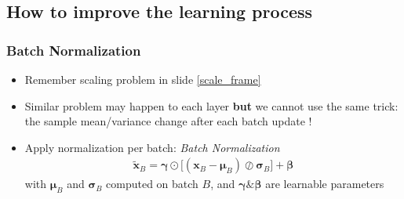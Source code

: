 \documentclass[pressentation,10pt,aspectratio=169,xcolor=table, colorlinks=true]{beamer}
\begin{document}
  \subsection{How to improve the learning process}

  \begin{frame}
    \frametitle{Batch Normalization}
    \begin{itemize}
    \item Remember scaling problem in slide \ref{scale_frame}
    \item Similar problem may happen to each layer \textbf{but} we cannot use the same trick: the sample mean/variance change after each batch update !
    \item<2-> Apply normalization per batch: \emph{Batch Normalization}
      \begin{align*}
        \tilde{\mathbf{x}}_B = \boldsymbol{\gamma}\odot\Big[(\mathbf{x}_B-\boldsymbol{\mu}_B)\oslash\boldsymbol{\sigma}_B\Big] + \boldsymbol{\beta}
      \end{align*}
      with \(\boldsymbol{\mu}_B\) and \(\boldsymbol{\sigma}_B\) computed on batch \(B\), and \(\boldsymbol{\gamma} \& \boldsymbol{\beta}\) are learnable parameters
    \end{itemize}

  \end{frame}
\end{document}
